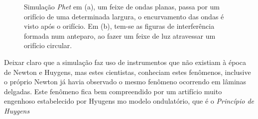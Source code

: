     \vspace*{10pt}
    \begin{figure}[!ht]        
        \centering              
        \hfill
        \caption{Simulação \emph{Phet} em (a), um feixe de ondas planas, passa por um orifício de uma determinada largura, o encurvamento das ondas é visto após o orifício. Em (b), tem-se as figuras de interferência formada num anteparo, ao fazer um feixe de luz atravessar um orifício circular.}
        \label{fig:difraction}
    \end{figure}
    \vspace*{10pt}

    Deixar claro que a simulação faz uso de instrumentos que não existiam à época de Newton e Huygens, mas estes cientistas, conheciam estes fenômenos, inclusive o próprio Newton já havia observado o mesmo fenômeno ocorrendo em lâminas delgadas. Este fenômeno fica bem compreendido por um artifício muito engenhoso estabelecido por Hyugens mo modelo ondulatório, que é o \emph{Princípio de Huygens}
    

